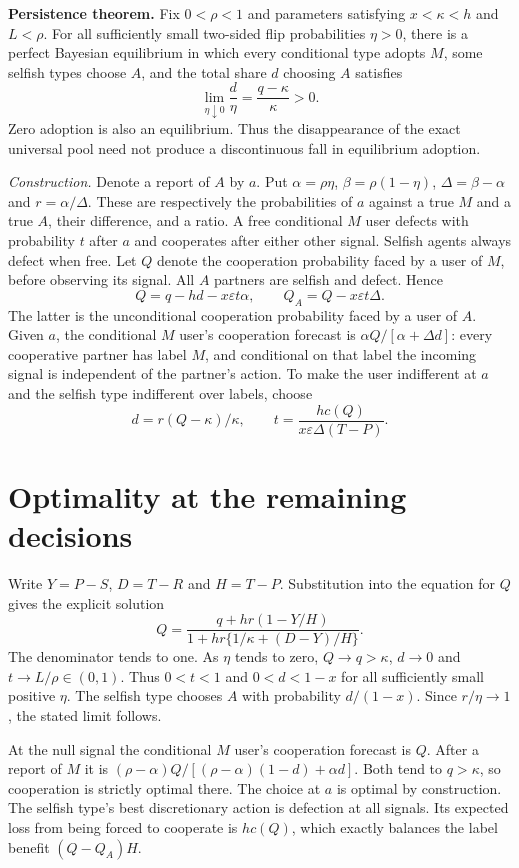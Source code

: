 \documentclass[11pt]{article}
\begin{document}
\textbf{Persistence theorem.} Fix $0<\rho<1$ and parameters satisfying $x<\kappa<h$ and $L<\rho$. For all sufficiently small two-sided flip probabilities $\eta>0$, there is a perfect Bayesian equilibrium in which every conditional type adopts $M$, some selfish types choose $A$, and the total share $d$ choosing $A$ satisfies
\[
       \lim_{\eta\downarrow0}\frac{d}{\eta}
                      =\frac{q-\kappa}{\kappa}>0.
\]
Zero adoption is also an equilibrium. Thus the disappearance of the exact universal pool need not produce a discontinuous fall in equilibrium adoption.

\emph{Construction.} Denote a report of $A$ by $a$. Put $\alpha=\rho\eta$, $\beta=\rho(1-\eta)$, $\Delta=\beta-\alpha$ and $r=\alpha/\Delta$. These are respectively the probabilities of $a$ against a true $M$ and a true $A$, their difference, and a ratio. A free conditional $M$ user defects with probability $t$ after $a$ and cooperates after either other signal. Selfish agents always defect when free. Let $Q$ denote the cooperation probability faced by a user of $M$, before observing its signal. All $A$ partners are selfish and defect. Hence
\[
 Q=q-hd-x\varepsilon t\alpha,\qquad
 Q_A=Q-x\varepsilon t\Delta .
\]
The latter is the unconditional cooperation probability faced by a user of $A$. Given $a$, the conditional $M$ user's cooperation forecast is $\alpha Q/[\alpha+\Delta d]$: every cooperative partner has label $M$, and conditional on that label the incoming signal is independent of the partner's action. To make the user indifferent at $a$ and the selfish type indifferent over labels, choose
\[
 d=r(Q-\kappa)/\kappa,\qquad
 t=\frac{h c(Q)}{x\varepsilon\Delta(T-P)}.
\]

\newpage
\section*{Optimality at the remaining decisions}
Write $Y=P-S$, $D=T-R$ and $H=T-P$. Substitution into the equation for $Q$ gives the explicit solution
\[
 Q=\frac{q+hr(1-Y/H)}
         {1+hr\{1/\kappa+(D-Y)/H\}}.
\]
The denominator tends to one. As $\eta$ tends to zero, $Q\to q>\kappa$, $d\to0$ and $t\to L/\rho\in(0,1)$. Thus $0<t<1$ and $0<d<1-x$ for all sufficiently small positive $\eta$. The selfish type chooses $A$ with probability $d/(1-x)$. Since $r/\eta\to1$, the stated limit follows.

At the null signal the conditional $M$ user's cooperation forecast is $Q$. After a report of $M$ it is $(\rho-\alpha)Q/[(\rho-\alpha)(1-d)+\alpha d]$. Both tend to $q>\kappa$, so cooperation is strictly optimal there. The choice at $a$ is optimal by construction. The selfish type's best discretionary action is defection at all signals. Its expected loss from being forced to cooperate is $h c(Q)$, which exactly balances the label benefit $(Q-Q_A)H$.
\end{document}
